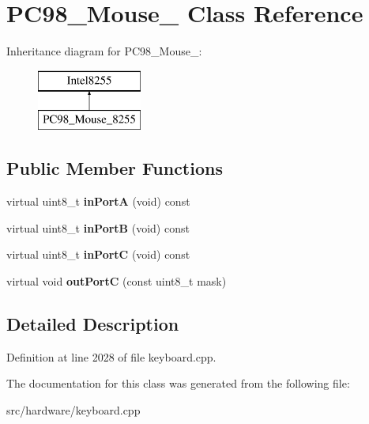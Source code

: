 \hypertarget{classPC98__Mouse__8255}{\section{P\-C98\-\_\-\-Mouse\-\_ Class Reference}
\label{classPC98__Mouse__8255}
}
Inheritance diagram for P\-C98\-\_\-\-Mouse\-\_\-:\begin{figure}[H]
\begin{center}
\leavevmode
\includegraphics[height=2.000000cm]{classPC98__Mouse__8255}
\end{center}
\end{figure}
\subsection*{Public Member Functions}
\begin{DoxyCompactItemize}
\item 
\hypertarget{classPC98__Mouse__8255_ae7643f0d9646d6aac477f26fbf6132a4}{virtual uint8\-\_\-t {\bfseries in\-Port\-A} (void) const }\label{classPC98__Mouse__8255_ae7643f0d9646d6aac477f26fbf6132a4}

\item 
\hypertarget{classPC98__Mouse__8255_a62483e81d5fad011aaaca35aeee59308}{virtual uint8\-\_\-t {\bfseries in\-Port\-B} (void) const }\label{classPC98__Mouse__8255_a62483e81d5fad011aaaca35aeee59308}

\item 
\hypertarget{classPC98__Mouse__8255_aa65cf202bb7b8c59cd7911aeddf9f2bd}{virtual uint8\-\_\-t {\bfseries in\-Port\-C} (void) const }\label{classPC98__Mouse__8255_aa65cf202bb7b8c59cd7911aeddf9f2bd}

\item 
\hypertarget{classPC98__Mouse__8255_af64ccdbfb0d8eff0711088b3de6b4949}{virtual void {\bfseries out\-Port\-C} (const uint8\-\_\-t mask)}\label{classPC98__Mouse__8255_af64ccdbfb0d8eff0711088b3de6b4949}

\end{DoxyCompactItemize}


\subsection{Detailed Description}


Definition at line 2028 of file keyboard.\-cpp.



The documentation for this class was generated from the following file\-:\begin{DoxyCompactItemize}
\item 
src/hardware/keyboard.\-cpp\end{DoxyCompactItemize}
